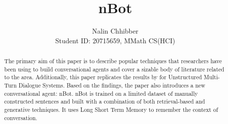 \documentclass[letterpaper] {article} %
\begin{document}
%
\title{nBot}
\author{Nalin Chhibber\\ Student ID: 20715659, MMath CS(HCI)}
\maketitle
\begin{abstract}
The primary aim of this paper is to describe popular techniques that researchers have been using to build conversational agents and cover a sizable body of literature related to the area. Additionally, this paper replicates the results by \cite{lowe2015ubuntu} for Unstructured Multi-Turn Dialogue Systems. Based on the findings, the paper also introduces a new conversational agent: nBot. nBot is trained on a limited dataset of manually constructed sentences and built with a combination of both retrieval-based and generative techniques. It uses Long Short Term Memory to remember the context of conversation.
\end{abstract}
\end{document}
